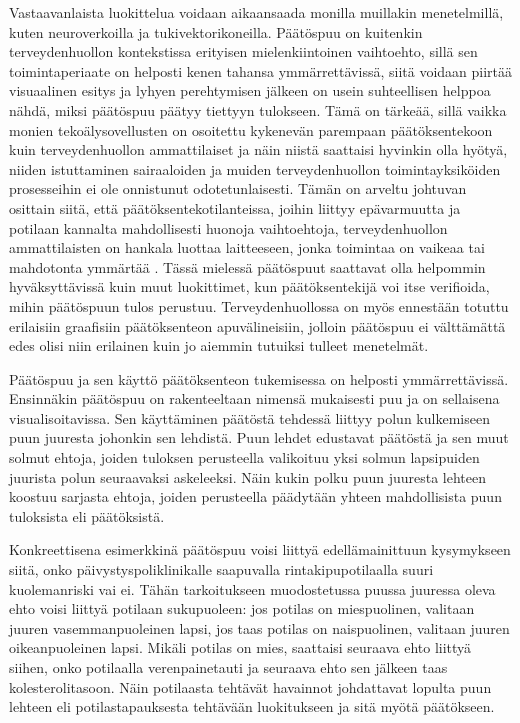 \documentclass[12pt,finnish]{tktltiki2}
\theoremstyle{definition}
\theoremstyle{remark}
\begin{document}
Vastaavanlaista luokittelua voidaan aikaansaada monilla muillakin menetelmillä, kuten neuroverkoilla
ja tukivektorikoneilla. Päätöspuu on kuitenkin terveydenhuollon kontekstissa erityisen
mielenkiintoinen vaihtoehto, sillä sen toimintaperiaate on helposti kenen tahansa ymmärrettävissä,
siitä voidaan piirtää visuaalinen esitys ja lyhyen perehtymisen jälkeen on usein suhteellisen helppoa nähdä, miksi
päätöspuu päätyy tiettyyn tulokseen. Tämä on tärkeää, sillä vaikka monien tekoälysovellusten
on osoitettu kykenevän parempaan päätöksentekoon kuin terveydenhuollon ammattilaiset ja näin
niistä saattaisi hyvinkin olla hyötyä, niiden istuttaminen sairaaloiden ja muiden terveydenhuollon
toimintayksiköiden prosesseihin ei ole onnistunut odotetunlaisesti.
Tämän on arveltu johtuvan osittain siitä, että päätöksentekotilanteissa, joihin liittyy epävarmuutta
ja potilaan kannalta mahdollisesti huonoja vaihtoehtoja, terveydenhuollon ammattilaisten on hankala
luottaa laitteeseen, jonka toimintaa on vaikeaa tai mahdotonta ymmärtää \cite{comingOfAgeOfAIInMedicine}. 
Tässä mielessä päätöspuut saattavat olla helpommin
hyväksyttävissä kuin muut luokittimet, kun päätöksentekijä voi itse verifioida, mihin päätöspuun
tulos perustuu. Terveydenhuollossa on myös ennestään totuttu erilaisiin graafisiin päätöksenteon
apuvälineisiin, jolloin päätöspuu ei välttämättä edes olisi niin erilainen kuin jo aiemmin tutuiksi
tulleet menetelmät.
 
Päätöspuu ja sen käyttö päätöksenteon tukemisessa on helposti ymmärrettävissä. Ensinnäkin päätöspuu
on rakenteeltaan nimensä mukaisesti puu ja on sellaisena visualisoitavissa. Sen käyttäminen päätöstä
tehdessä liittyy polun kulkemiseen puun juuresta johonkin sen lehdistä. Puun lehdet edustavat päätöstä
ja sen muut solmut ehtoja, joiden tuloksen perusteella valikoituu yksi solmun lapsipuiden juurista
polun seuraavaksi askeleeksi. Näin kukin polku puun juuresta lehteen koostuu sarjasta ehtoja, joiden
perusteella päädytään yhteen mahdollisista puun tuloksista eli päätöksistä.

Konkreettisena esimerkkinä päätöspuu voisi liittyä edellämainittuun kysymykseen siitä, onko
päivystyspoliklinikalle saapuvalla rintakipupotilaalla suuri kuolemanriski vai ei. Tähän tarkoitukseen
muodostetussa puussa juuressa oleva ehto voisi liittyä potilaan sukupuoleen: jos potilas on miespuolinen,
valitaan juuren vasemmanpuoleinen lapsi, jos taas potilas on naispuolinen, valitaan
juuren oikeanpuoleinen lapsi. Mikäli potilas on mies, saattaisi seuraava ehto liittyä siihen,
onko potilaalla verenpainetauti ja seuraava ehto sen jälkeen taas kolesterolitasoon. Näin
potilaasta tehtävät havainnot johdattavat lopulta puun lehteen eli potilastapauksesta tehtävään
luokitukseen ja sitä myötä päätökseen.
\end{document}

